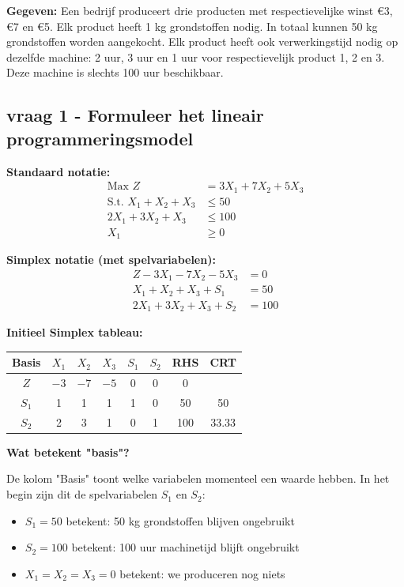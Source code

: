 \documentclass[a4paper,11pt]{article}
\begin{document}
\begin{oefenblok}[title=Productie Optimalisatie bij een Bedrijf]
    
\textbf{Gegeven:} Een bedrijf produceert drie producten met respectievelijke winst €3, €7 en €5. Elk product heeft 1 kg grondstoffen nodig. In totaal kunnen 50 kg grondstoffen worden aangekocht. Elk product heeft ook verwerkingstijd nodig op dezelfde machine: 2 uur, 3 uur en 1 uur voor respectievelijk product 1, 2 en 3. Deze machine is slechts 100 uur beschikbaar.

\subsection*{vraag 1 - Formuleer het lineair programmeringsmodel}

\textbf{Standaard notatie:}
\begin{align*}
\text{Max } Z &= 3X_1 + 7X_2 + 5X_3 \\
\text{S.t. } X_1 + X_2 + X_3 &\leq 50 \\
2X_1 + 3X_2 + X_3 &\leq 100 \\
X_1 &\geq 0
\end{align*}

\textbf{Simplex notatie (met spelvariabelen):}
\begin{align*}
Z - 3X_1 - 7X_2 - 5X_3 &= 0 \\
X_1 + X_2 + X_3 + S_1 &= 50 \\
2X_1 + 3X_2 + X_3 + S_2 &= 100
\end{align*}

\textbf{Initieel Simplex tableau:}

\begin{center}
\begin{tabular}{c|ccccc|c|c}
\hline
Basis & $X_1$ & $X_2$ & $X_3$ & $S_1$ & $S_2$ & RHS & CRT \\
\hline
$Z$ & $-3$ & $-7$ & $-5$ & 0 & 0 & 0 & \\
$S_1$ & 1 & 1 & 1 & 1 & 0 & 50 & 50 \\
$S_2$ & 2 & 3 & 1 & 0 & 1 & 100 & 33.33 \\
\hline
\end{tabular}
\end{center}

\textbf{Wat betekent "basis"?}

De kolom "Basis" toont welke variabelen momenteel een waarde hebben. In het begin zijn dit de spelvariabelen $S_1$ en $S_2$:
\begin{itemize}
    \item $S_1 = 50$ betekent: 50 kg grondstoffen blijven ongebruikt
    \item $S_2 = 100$ betekent: 100 uur machinetijd blijft ongebruikt
    \item $X_1 = X_2 = X_3 = 0$ betekent: we produceren nog niets
\end{itemize}


\end{oefenblok}
\end{document}
